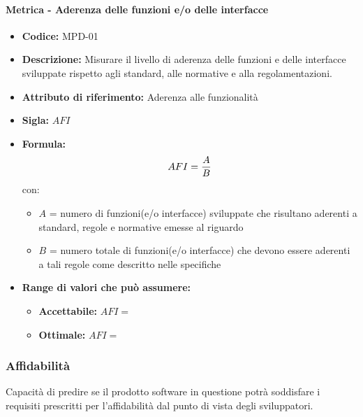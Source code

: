               \paragraph{Metrica - Aderenza delle funzioni e/o delle interfacce} 
              \begin{itemize}
          \item  \textbf{Codice:} MPD-01
        \item    \textbf{Descrizione:} Misurare il livello di aderenza delle funzioni e delle interfacce sviluppate rispetto agli standard, alle normative e alla regolamentazioni.
          \item  \textbf{Attributo di riferimento:} Aderenza alle funzionalità 
        \item    \textbf{Sigla:} $AFI$
         \item   \textbf{Formula:} $$AFI = {A \over B}$$
                con:
                \begin{itemize}
                    \item  $A$ = numero di funzioni(e/o interfacce) sviluppate che risultano aderenti a standard, regole e normative emesse al riguardo
                    \item  $B$ = numero totale di funzioni(e/o interfacce) che devono essere aderenti a tali regole come descritto nelle specifiche
                \end{itemize}

                \item \textbf{Range di valori che può assumere:}
                \begin{itemize}
                    \item \textbf{Accettabile:} $AFI = $
                    \item \textbf{Ottimale:} $AFI = $
                \end{itemize}
            \end{itemize}
              
  \subsubsection{Affidabilità} 
  Capacità di predire se il prodotto software in questione potrà soddisfare i requisiti prescritti per l'affidabilità dal punto di vista degli sviluppatori.
